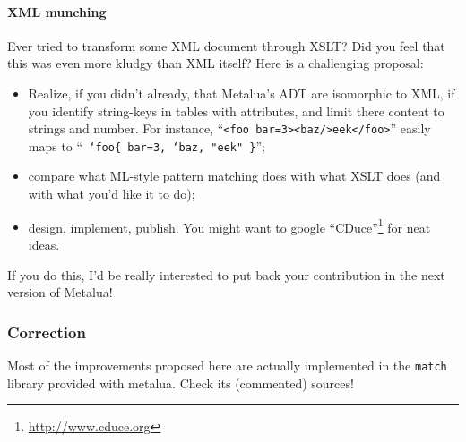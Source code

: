 \paragraph{XML munching} Ever tried to transform some XML document through
XSLT? Did you feel that this was even more kludgy than XML itself? Here
is a challenging proposal:
\begin{itemize}
\item Realize, if you didn't already, that Metalua's ADT are
  isomorphic to XML, if you identify string-keys in tables with
  attributes, and limit there content to strings and number. For
  instance, ``{\tt <foo bar=3><baz/>eek</foo>}'' easily maps to ``{\tt
    `foo\{ bar=3, `baz, "eek" \}}'';
\item compare what ML-style pattern matching does with what XSLT
  does (and with what you'd like it to do);
\item design, implement, publish. You might want to google
  ``CDuce''\footnote{\url{http://www.cduce.org}} for neat ideas.
\end{itemize}

If you do this, I'd be really interested to put back your contribution
in the next version of Metalua!

\subsubsection{Correction}
Most of the improvements proposed here are actually implemented in the
{\tt match} library provided with metalua. Check its (commented)
sources!
